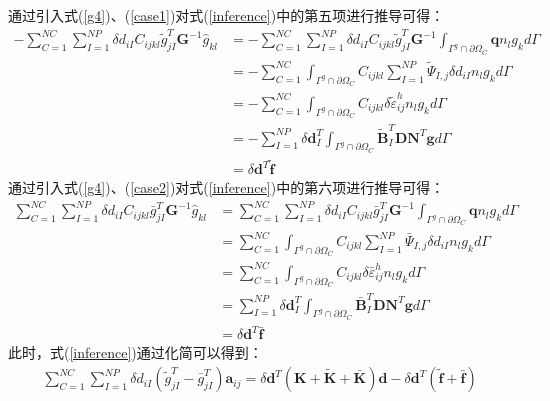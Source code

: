 通过引入式(\ref{g4})、(\ref{case1})对式(\ref{inference})中的第五项进行推导可得：
\begin{equation}
\begin{split}
    -\sum_{C=1}^{N\!C}\sum_{I=1}^{N\!P}\delta d_{iI}C_{ijkl}\tilde{g}^T_{jI}\pmb{G}^{-1}\hat{g}_{kl}
    &=-\sum_{C=1}^{N\!C}\sum_{I=1}^{N\!P}\delta d_{iI}C_{ijkl}\tilde{g}^T_{jI}\pmb{G}^{-1}\int_{\Gamma^g\cap\partial\Omega_C}\pmb{q}n_lg_kd\Gamma\\
    &=-\sum_{C=1}^{N\!C}\int_{\Gamma^g\cap\partial\Omega_C}C_{ijkl}\sum_{I=1}^{N\!P}\tilde{\Psi}_{I,j}\delta d_{iI}n_lg_kd\Gamma\\
    &=-\sum_{C=1}^{N\!C}\int_{\Gamma^g\cap\partial\Omega_C}C_{ijkl}\delta\tilde{\varepsilon}_{ij}^hn_lg_kd\Gamma\\
    &=-\sum_{I=1}^{N\!P}\delta\pmb{d}_I^T\int_{\Gamma^g\cap\partial\Omega_C}\tilde{\pmb{B}}_I^T\pmb{D}\pmb{N}^T\pmb{g}d\Gamma\\
    &=\delta\pmb{d}^T\tilde{\pmb{f}}
\end{split}
\end{equation}
通过引入式(\ref{g4})、(\ref{case2})对式(\ref{inference})中的第六项进行推导可得：
\begin{equation}
\begin{split}
    \sum_{C=1}^{N\!C}\sum_{I=1}^{N\!P}\delta d_{iI}C_{ijkl}\bar{g}^T_{jI}\pmb{G}^{-1}\hat{g}_{kl}
    &=\sum_{C=1}^{N\!C}\sum_{I=1}^{N\!P}\delta d_{iI}C_{ijkl}\bar{g}^T_{jI}\pmb{G}^{-1}\int_{\Gamma^g\cap\partial\Omega_C}\pmb{q}n_lg_kd\Gamma\\
    &=\sum_{C=1}^{N\!C}\int_{\Gamma^g\cap\partial\Omega_C}C_{ijkl}\sum_{I=1}^{N\!P}\bar{\Psi}_{I,j}\delta d_{iI}n_lg_kd\Gamma\\
    &=\sum_{C=1}^{N\!C}\int_{\Gamma^g\cap\partial\Omega_C}C_{ijkl}\delta\bar{\varepsilon}_{ij}^hn_lg_kd\Gamma\\
    &=\sum_{I=1}^{N\!P}\delta\pmb{d}_I^T\int_{\Gamma^g\cap\partial\Omega_C}\bar{\pmb{B}}_I^T\pmb{D}\pmb{N}^T\pmb{g}d\Gamma\\
    &=\delta\pmb{d}^T\bar{\pmb{f}}
\end{split}
\end{equation}
此时，式(\ref{inference})通过化简可以得到：
\begin{equation}\label{simplify}
\begin{split}
    \sum_{C=1}^{N\!C}\sum_{I=1}^{N\!P}\delta d_{iI}(\tilde{g}_{jI}^T-\bar{g}_{jI}^T)\pmb{a}_{ij}=
    \delta\pmb{d}^T(\pmb{K}+\tilde{\pmb{K}}+\bar{\pmb{K}})\pmb{d}-\delta\pmb{d}^T(\tilde{\pmb{f}}+\bar{\pmb{f}})
\end{split}
\end{equation}
